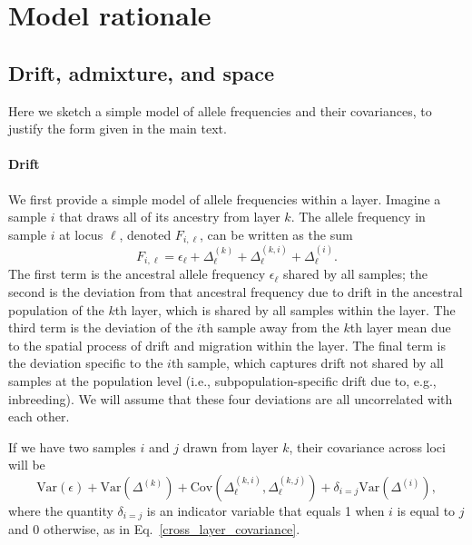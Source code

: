 \documentclass[10pt,letterpaper]{article}
\begin{document}


\section*{Model rationale} \label{rationale}
\subsection*{Drift, admixture, and space}
Here we sketch a simple model of allele frequencies and their
covariances, to justify the form given in the main text.
\paragraph{Drift} 
We first provide a simple model of allele frequencies within a layer. 
Imagine a sample $i$ that draws all of its ancestry from layer $k$.
The allele frequency in sample $i$ at locus $\ell$, denoted $F_{i,\ell}$, can be
written as the sum
\begin{equation}
F_{i,\ell} = \epsilon_{\ell} + \Delta^{(k)}_{\ell} +
\Delta^{(k,i)}_{\ell} + \Delta^{(i)}_{\ell} .
\label{drift_terms_no_admix}
\end{equation}
The first term is the ancestral allele frequency $\epsilon_\ell$ shared by all samples; 
the second is the deviation from that ancestral frequency 
due to drift in the ancestral population of the $k$th layer,
which is shared by all samples within the layer. 
The third term is the deviation of the $i$th sample away from the $k$th layer mean 
due to the spatial process of drift and migration within the layer.
The final term is the deviation specific to the $i$th sample,
which captures drift not shared by all samples at the population level
(i.e., subpopulation-specific drift due to, e.g., inbreeding). 
We will assume that these four deviations are all uncorrelated with each other.

If we have two samples $i$ and $j$ drawn from layer $k$, 
their covariance across loci will be 
\begin{equation}
\text{Var}(\epsilon) +  \text{Var}\left( \Delta^{(k)} \right) +
\text{Cov}(\Delta^{(k,i)}_{\ell},\Delta^{(k,j)}_{\ell}) + \delta_{i=j} \text{Var}\left( \Delta^{(i)} \right),
\end{equation}
where the quantity $\delta_{i=j}$ is an indicator variable that equals 1 when $i$ is equal to $j$ and 0 otherwise, 
as in Eq.\ \eqref{cross_layer_covariance}.
\end{document}
